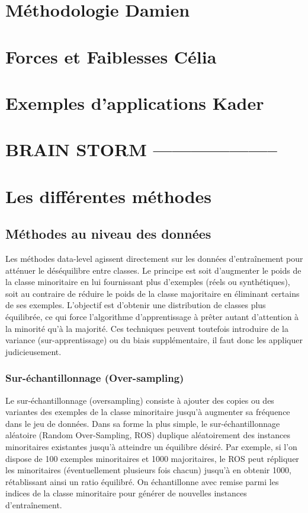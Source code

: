 \documentclass[a4paper,12pt]{article}
\begin{document}
\newpage

\section{Méthodologie Damien}

\newpage

\section{Forces et Faiblesses Célia}

\newpage

\section{Exemples d'applications Kader}

\newpage

\section{BRAIN STORM --------------------}

\section{Les différentes méthodes}
\subsection{Méthodes au niveau des données}
Les méthodes data-level agissent directement sur les données d’entraînement pour atténuer le
déséquilibre entre classes. Le principe est soit d’augmenter le poids de la classe minoritaire en lui
fournissant plus d’exemples (réels ou synthétiques), soit au contraire de réduire le poids de la classe
majoritaire en éliminant certains de ses exemples. L’objectif est d’obtenir une distribution de classes
plus équilibrée, ce qui force l’algorithme d’apprentissage à prêter autant d’attention à la minorité qu’à la
majorité. Ces techniques peuvent toutefois introduire de la variance (sur-apprentissage) ou du
biais supplémentaire, il faut donc les appliquer judicieusement.

\subsubsection{Sur-échantillonnage (Over-sampling)}

Le sur-échantillonnage (oversampling) consiste à ajouter des copies ou des variantes des exemples de
la classe minoritaire jusqu’à augmenter sa fréquence dans le jeu de données. Dans sa forme la plus
simple, le sur-échantillonnage aléatoire (Random Over-Sampling, ROS) duplique aléatoirement des
instances minoritaires existantes jusqu’à atteindre un équilibre désiré. Par exemple, si l’on dispose
de 100 exemples minoritaires et 1000 majoritaires, le ROS peut répliquer les minoritaires
(éventuellement plusieurs fois chacun) jusqu’à en obtenir 1000, rétablissant ainsi un ratio équilibré. On échantillonne avec remise parmi les indices de la classe minoritaire pour
générer de nouvelles instances d’entraînement.
\end{document}
